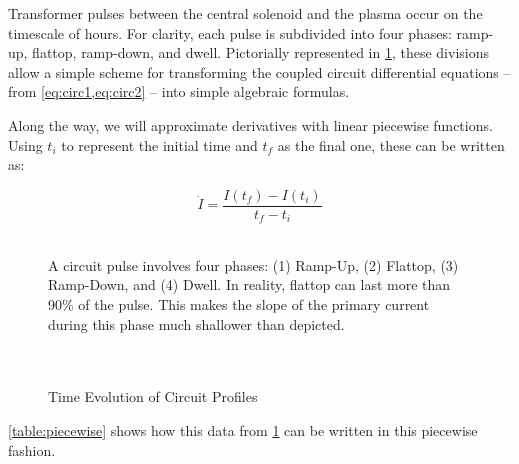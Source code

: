 Transformer pulses between the central solenoid and the plasma occur on the timescale of hours.  For clarity, each pulse is subdivided into four phases: ramp-up, flattop, ramp-down, and dwell. Pictorially represented in \cref{fig:circuit_profiles}, these divisions allow a simple scheme for transforming the coupled circuit differential equations -- from \cref{eq:circ1,eq:circ2} -- into simple algebraic formulas.

Along the way, we will approximate derivatives with linear piecewise functions. Using $t_i$ to represent the initial time and $t_f$ as the final one, these can be written as:

\begin{equation}
	\dot I = \frac{ I(t_f) - I(t_i) }{t_f - t_i}
\end{equation}

\begin{figure}[t!]
\centering

\begin{adjustbox}{width=0.9\textwidth}
\large

\end{adjustbox}
\caption{Time Evolution of Circuit Profiles}
\label{fig:circuit_profiles} ~\\
\small{A circuit pulse involves four phases: (1) Ramp-Up, (2) Flattop, (3) Ramp-Down, and (4) Dwell. In reality, flattop can last more than 90\% of the pulse.\cite{inputfile} This makes the slope of the primary current during this phase much shallower than depicted. } ~ \\ ~ \\ ~ \\
\end{figure}

\cref{table:piecewise} shows how this data from \cref{fig:circuit_profiles} can be written in this piecewise fashion.

